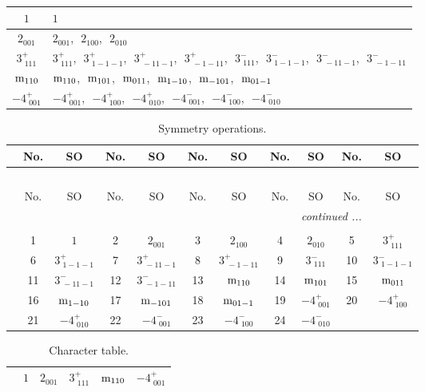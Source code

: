 \documentclass[fleqn,10pt,landscape]{article}
\begin{document}
\begin{itemize}
\begin{center}
\begin{longtable}{c|l}
$1$ & $1$ \\ \hline
$2{}_{001}$ & $2{}_{001}$,\,\, $2{}_{100}$,\,\, $2{}_{010}$ \\ \hline
$3^{+}_{\,\,111}$ & $3^{+}_{\,\,111}$,\,\, $3^{+}_{\,\,1-1-1}$,\,\, $3^{+}_{\,\,-11-1}$,\,\, $3^{+}_{\,\,-1-11}$,\,\, $3^{-}_{\,\,111}$,\,\, $3^{-}_{\,\,1-1-1}$,\,\, $3^{-}_{\,\,-11-1}$,\,\, $3^{-}_{\,\,-1-11}$ \\ \hline
${\rm m}_{110}$ & ${\rm m}_{110}$,\,\, ${\rm m}_{101}$,\,\, ${\rm m}_{011}$,\,\, ${\rm m}_{1-10}$,\,\, ${\rm m}_{-101}$,\,\, ${\rm m}_{01-1}$ \\ \hline
$-4^{+}_{\,\,001}$ & $-4^{+}_{\,\,001}$,\,\, $-4^{+}_{\,\,100}$,\,\, $-4^{+}_{\,\,010}$,\,\, $-4^{-}_{\,\,001}$,\,\, $-4^{-}_{\,\,100}$,\,\, $-4^{-}_{\,\,010}$ \\
\end{longtable}
\end{center}
\begin{center}
\renewcommand{\arraystretch}{1.3}
\begin{longtable}{c|cc|cc|cc|cc|cc}
\caption{Symmetry operations.}
 \\
 \hline \hline
 & No. & SO & No. & SO & No. & SO & No. & SO & No. & SO \\ \hline \endfirsthead

\multicolumn{10}{l}{\tablename\ \thetable{}} \\
 \hline \hline
 & No. & SO & No. & SO & No. & SO & No. & SO & No. & SO \\ \hline \endhead

 \hline \hline
\multicolumn{10}{r}{\footnotesize\it continued ...} \\ \endfoot

 \hline \hline
\multicolumn{10}{r}{} \\ \endlastfoot

 & 1 & $1$ & 2 & $2{}_{001}$ & 3 & $2{}_{100}$ & 4 & $2{}_{010}$ & 5 & $3^{+}_{\,\,111}$ \\
& 6 & $3^{+}_{\,\,1-1-1}$ & 7 & $3^{+}_{\,\,-11-1}$ & 8 & $3^{+}_{\,\,-1-11}$ & 9 & $3^{-}_{\,\,111}$ & 10 & $3^{-}_{\,\,1-1-1}$ \\
& 11 & $3^{-}_{\,\,-11-1}$ & 12 & $3^{-}_{\,\,-1-11}$ & 13 & ${\rm m}_{110}$ & 14 & ${\rm m}_{101}$ & 15 & ${\rm m}_{011}$ \\
& 16 & ${\rm m}_{1-10}$ & 17 & ${\rm m}_{-101}$ & 18 & ${\rm m}_{01-1}$ & 19 & $-4^{+}_{\,\,001}$ & 20 & $-4^{+}_{\,\,100}$ \\
& 21 & $-4^{+}_{\,\,010}$ & 22 & $-4^{-}_{\,\,001}$ & 23 & $-4^{-}_{\,\,100}$ & 24 & $-4^{-}_{\,\,010}$ &  &  \\
\end{longtable}
\end{center}
\begin{center}
\renewcommand{\arraystretch}{1.0}
\begin{longtable}{c|rrrrr}
\caption{Character table.}
 \\
 \hline \hline
 & $ 1 $ & $ 2{}_{001} $ & $ 3^{+}_{\,\,111} $ & $ {\rm m}_{110} $ & $ -4^{+}_{\,\,001} $ \\ \hline \endfirsthead


\end{longtable}
\end{center}
\end{itemize}
\end{document}
